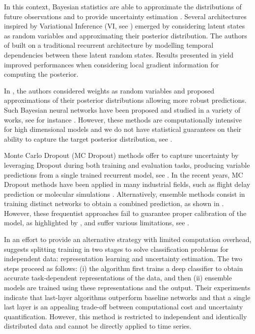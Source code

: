 \documentclass[journal]{IEEEtran}
\begin{document}
In this context, Bayesian statistics are able to approximate the distributions of future observations and to provide uncertainty estimation \cite{Hinton1995BayesianLF}.
Several architectures inspired by Variational Inference (VI, see \cite{Jordan2004AnIT}) emerged by considering latent states as random variables and approximating their posterior distribution.
The authors of \cite{Chung2015NIPS,10.5555/3157096.3157343} built on a traditional recurrent architecture by modelling temporal dependencies between these latent random states. Results presented in \cite{Fortunato2017bayesian} yield improved performances when considering local gradient information for computing the posterior.


In \cite{Blundell2015}, the authors considered weights as random variables and proposed approximations of their posterior distributions allowing more robust predictions. Such Bayesian neural networks have been proposed and studied in a variety of works, see for instance \cite{hernandez2015probabilistic,khan2018fast,teye2018bayesian}. However, these methods are computationally intensive for high dimensional models and we do not have statistical guarantees on their ability to capture the target  posterior distribution, see \cite{NEURIPS2020_b6dfd418}.

Monte Carlo Dropout (MC Dropout) methods offer to capture uncertainty by leveraging Dropout during both training and evaluation tasks, producing variable predictions from a single trained recurrent model, see \cite{Gal2016NIPS}.
In the recent years, MC Dropout methods have been applied in many industrial fields, such as flight delay prediction \cite{Vandal2018} or molecular simulations \cite{Wen2020UncertaintyQI}.
Alternatively, ensemble methods consist in training distinct networks to obtain a combined prediction, as shown in \cite{Pearce2018}.
However, these frequentist approaches fail to guarantee proper calibration of the model, as highlighted by \cite{ashukha2020pitfalls}, and suffer various limitations, see \cite{Fong2020}.

In an effort to provide an alternative strategy with limited computation overhead, \cite{Brosse2020OnLA} suggests splitting training in two stages to solve classification problems for independent data: representation learning and uncertainty estimation. The two steps proceed as follows: (i) the algorithm first trains a deep classifier to obtain accurate task-dependent representations of the data, and then (ii) ensemble models are trained using these representations and the output. Their experiments indicate that last-layer algorithms outperform baseline networks and that a single last layer is an appealing trade-off between computational cost and uncertainty quantification. However, this method is restricted to independent and identically distributed data and cannot be directly applied to time series.
\end{document}
